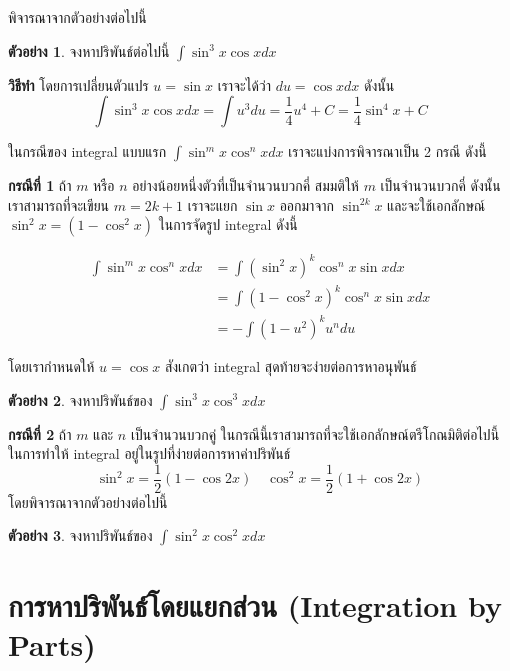 \documentclass[
]{book}
\theoremstyle{definition}
\theoremstyle{definition}
\newtheorem{example}{ตัวอย่าง}[chapter]
\theoremstyle{definition}
\theoremstyle{definition}
\theoremstyle{remark}
\begin{document}
พิจารณาจากตัวอย่างต่อไปนี้

\begin{example}
จงหาปริพันธ์ต่อไปนี้ \(\int \sin^3 x \cos x dx\)
\end{example}

\textbf{วิธีทำ} โดยการเปลี่ยนตัวแปร \(u = \sin x\) เราจะได้ว่า \(du = \cos x dx\) ดังนั้น
\[\int \sin^3 x \cos x dx = \int u^3 du = \frac{1}{4}u^4 + C = \frac{1}{4} \sin ^4 x + C\]

ในกรณีของ integral แบบแรก \(\int \sin^m x \cos^n x dx\)
เราจะแบ่งการพิจารณาเป็น 2 กรณี ดังนี้

\textbf{กรณีที่ 1} ถ้า \(m\) หรือ \(n\) อย่างน้อยหนึ่งตัวที่เป็นจำนวนบวกคี่ สมมติให้ \(m\)
เป็นจำนวนบวกคี่ ดังนั้นเราสามารถที่จะเขียน \(m = 2k +1\) เราจะแยก \(\sin x\) ออกมาจาก
\(\sin^{2k} x\) และจะใช้เอกลักษณ์ \(\sin^2 x = (1 - \cos^2 x)\) ในการจัดรูป
integral ดังนี้

\begin{equation}
\begin{aligned}
        \int \sin^m x \cos^n x dx &= \int (\sin^{2}x)^k \cos^n x \sin x dx \\
                                    &= \int (1 - \cos^2 x)^k \cos^n x \sin x dx \\
    &= - \int (1 - u^2)^k u^n du 
\end{aligned}
\end{equation}

โดยเรากำหนดให้ \(u = \cos x\) สังเกตว่า integral สุดท้ายจะง่ายต่อการหาอนุพันธ์

\begin{example}
จงหาปริพันธ์ของ \(\int \sin^3 x \cos^3 x dx\)
\end{example}

\textbf{กรณีที่ 2} ถ้า \(m\) และ \(n\) เป็นจำนวนบวกคู่
ในกรณีนี้เราสามารถที่จะใช้เอกลักษณ์ตรีโกณมิติต่อไปนี้ในการทำให้ integral
อยู่ในรูปที่ง่ายต่อการหาค่าปริพันธ์
\[\sin^2 x = \frac{1}{2}(1-\cos 2x) \quad  \cos^2 x = \frac{1}{2}(1 + \cos 2x)\]
โดยพิจารณาจากตัวอย่างต่อไปนี้

\begin{example}
จงหาปริพันธ์ของ \(\int \sin^2 x \cos^2 x dx\)
\end{example}

\section{การหาปริพันธ์โดยแยกส่วน (Integration by Parts)}\label{uxe01uxe32uxe23uxe2buxe32uxe1buxe23uxe1euxe19uxe18uxe42uxe14uxe22uxe41uxe22uxe01uxe2auxe27uxe19-integration-by-parts}
\end{document}
